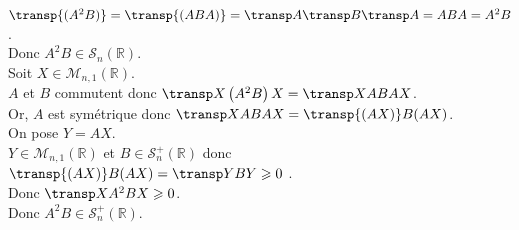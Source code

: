 \begin{enumerate}
$\transp{(A^2B)}=\transp{(ABA)}=\transp A\transp B\transp A=ABA=A^2B$.\\
 Donc $A^2B\in \mathscr{S}_n\left( \mathbb{R}\right)$.\\
 \medskip
 Soit $X\in \mathscr{M}_{n,1} \left(\mathbb{R} \right)$.\\
 $A$ et $B$ commutent donc $\transp X \left( A^2B\right) X=\transp X ABAX$.\\
 Or, $A$ est symétrique donc $\transp X ABAX=\transp{\left( AX\right)} B(AX)$.\\
 On pose $Y=AX$. \\
 $Y\in\mathscr{M}_{n,1} \left(\mathbb{R} \right)$ et
  $B\in \mathscr{S}_n^{+}\left( \mathbb{R}\right)$ donc $\transp{\left( AX\right)}  B(AX)=\transp Y  BY \geqslant 0$ .\\
 Donc $\transp X A^2B X\geqslant 0$.\\
 Donc $A^2B\in \mathscr{S}_n^{+}\left( \mathbb{R}\right)$.

%
\end{enumerate}
